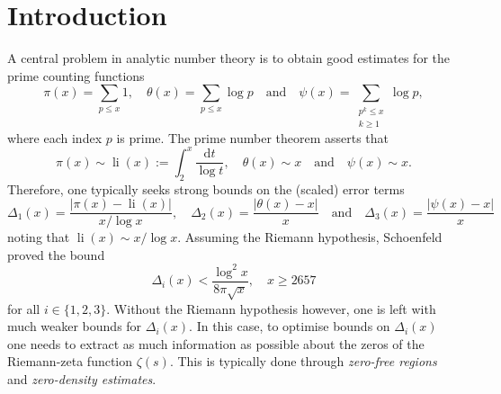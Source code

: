 \documentclass[reqno]{amsart}
\numberwithin{equation}{section}
\theoremstyle{remark}
\DeclareMathOperator{\li}{\mathrm{li}}
\begin{document}
\section{Introduction}
A central problem in analytic number theory is to obtain good estimates for the prime counting functions
\begin{equation*}
    \pi(x)=\sum_{p\leq x}1,\quad \theta(x)=\sum_{p\leq x}\log p\quad\text{and}\quad \psi(x)=\sum_{\substack{p^k\leq x\\ k\geq 1}}\log p,
\end{equation*}
where each index $p$ is prime. The prime number theorem asserts that
\begin{equation*}
    \pi(x)\sim\li(x):=\int_2^x\frac{\mathrm{d}t}{\log t},\quad\theta(x)\sim x\quad\text{and}\quad\psi(x)\sim x.
\end{equation*}
Therefore, one typically seeks strong bounds on the (scaled) error terms
\begin{equation}\label{deltadef}
    \Delta_{1}(x)=\frac{|\pi(x)-\li(x)|}{x/\log x},\quad \Delta_{2}(x)=\frac{|\theta(x)-x|}{x}\quad\text{and}\quad\Delta_{3}(x)=\frac{|\psi(x)-x|}{x}
\end{equation}
noting that $\li(x)\sim x/\log x$. Assuming the Riemann hypothesis, Schoenfeld \cite{schoenfeld1976sharper} proved the bound
\begin{equation*}
    \Delta_{i}(x)<\frac{\log^2x}{8\pi\sqrt{x}},\quad x\geq 2657
\end{equation*}
for all $i\in\{1,2,3\}$. Without the Riemann hypothesis however, one is left with much weaker bounds for $\Delta_{i}(x)$. In this case, to optimise bounds on $\Delta_{i}(x)$ one needs to extract as much information as possible about the zeros of the Riemann-zeta function $\zeta(s)$. This is typically done through \emph{zero-free regions} and \emph{zero-density estimates}.
\end{document}
